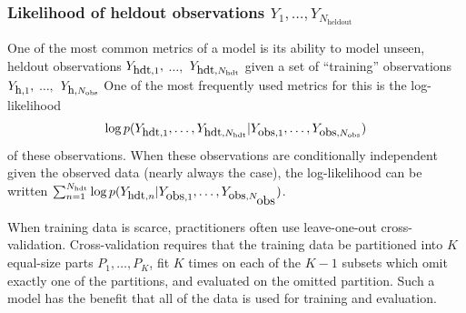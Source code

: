 


\subsubsection{Likelihood of heldout observations $Y_1, \ldots, Y_{N_{\mbox{heldout}}}$}
One of the most common metrics of a model is its ability to model
unseen, heldout observations $Y_{\mbox{\small hdt},1},$ $\ldots,$
$Y_{\mbox{\small hdt},N_{\mbox{\tiny hdt}}}$ given a set of ``training''
  observations $Y_{\mbox{\small h},1},$ $\ldots,$ $Y_{\mbox{\small
      h},N_{\mbox{\tiny obs}}}$ One of the most frequently used metrics
    for this is the log-likelihood
\begin{align*}
  \log
  p(Y_{\mbox{\small hdt},1}, \ldots, Y_{\mbox{\small hdt},N_{\mbox{\tiny hdt}}}
  | Y_{\mbox{\small obs},1}, \ldots, Y_{\mbox{\small obs}, N_{\mbox{\tiny obs}}})
\end{align*}
of these observations. When these observations are conditionally
independent given the observed data (nearly always the case), the
log-likelihood can be written $\sum_{n=1}^{N_{\mbox{\tiny hdt}}} \log
  p(Y_{\mbox{\small hdt},n} | Y_{\mbox{obs},1}, \ldots, Y_{\mbox{\small obs},N_{\mbox{obs}}})$.

When training data is scarce, practitioners often use leave-one-out
cross-validation.  Cross-validation requires that the training data be
partitioned into $K$ equal-size parts $P_1, \ldots, P_K$, fit $K$
times on each of the $K - 1$ subsets which omit exactly one of the
partitions, and evaluated on the omitted partition.  Such a model has
the benefit that all of the data is used for training and evaluation.

